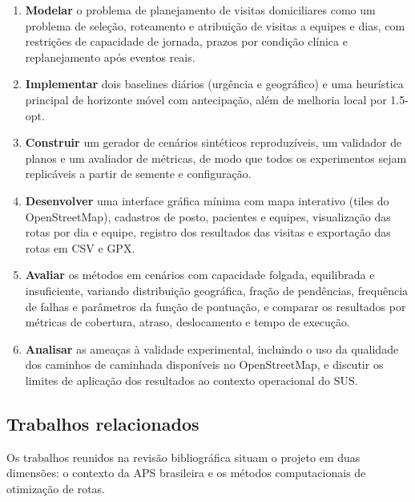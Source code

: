 \documentclass[11pt,a4paper]{article}
\providecommand{\tightlist}{%
  \setlength{\itemsep}{0pt}\setlength{\parskip}{0pt}}
\begin{document}
\begin{enumerate}
\def\labelenumi{\arabic{enumi}.}
\tightlist%
\item
  \textbf{Modelar} o problema de planejamento de visitas domiciliares
  como um problema de seleção, roteamento e atribuição de visitas a
  equipes e dias, com restrições de capacidade de jornada, prazos por
  condição clínica e replanejamento após eventos reais.
\item
  \textbf{Implementar} dois baselines diários (urgência e geográfico) e
  uma heurística principal de horizonte móvel com antecipação, além de
  melhoria local por 1.5-opt.
\item
  \textbf{Construir} um gerador de cenários sintéticos reproduzíveis, um
  validador de planos e um avaliador de métricas, de modo que todos os
  experimentos sejam replicáveis a partir de semente e configuração.
\item
  \textbf{Desenvolver} uma interface gráfica mínima com mapa interativo
  (tiles do OpenStreetMap), cadastros de posto, pacientes e equipes,
  visualização das rotas por dia e equipe, registro dos resultados das
  visitas e exportação das rotas em CSV e GPX.
\item
  \textbf{Avaliar} os métodos em cenários com capacidade folgada,
  equilibrada e insuficiente, variando distribuição geográfica, fração
  de pendências, frequência de falhas e parâmetros da função de
  pontuação, e comparar os resultados por métricas de cobertura, atraso,
  deslocamento e tempo de execução.
\item
  \textbf{Analisar} as ameaças à validade experimental, incluindo o uso
  da qualidade dos caminhos de caminhada disponíveis no OpenStreetMap, e
  discutir os limites de aplicação dos resultados ao contexto
  operacional do SUS.
\end{enumerate}

\subsection{Trabalhos relacionados}\label{trabalhos-relacionados}

Os trabalhos reunidos na revisão bibliográfica situam o projeto em duas
dimensões: o contexto da APS brasileira e os métodos computacionais de
otimização de rotas.
\end{document}
